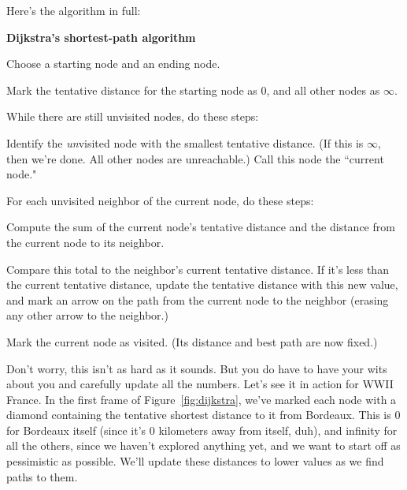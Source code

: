 Here's the algorithm in full:

\vspace{.1in}
\begin{samepage}
\begin{framed}
\textbf{Dijkstra's shortest-path algorithm}
\begin{compactenum}
\item Choose a starting node and an ending node.
\item Mark the tentative distance for the starting node as 0, and all
other nodes as $\infty$.
\item While there are still unvisited nodes, do these steps:
    \begin{compactenum}
    \item \label{choose} Identify the \textit{un}visited node with the smallest tentative
distance. (If this is $\infty$, then we're done. All other nodes are
unreachable.) Call this node the ``current node."
    \item For each unvisited neighbor of the current node, do these steps:
        \begin{compactenum}
        \item Compute the sum of the current node's tentative distance and
the distance from the current node to its neighbor.
        \item Compare this total to the neighbor's current tentative
distance. If it's less than the current tentative distance, update the
tentative distance with this new value, and mark an arrow on the path from
the current node to the neighbor (erasing any other arrow to the neighbor.)
        \item Mark the current node as visited. (Its distance and best path
are now fixed.)
        \end{compactenum}
    \end{compactenum}
\end{compactenum}
\end{framed}
\end{samepage}
\vspace{.2in}

Don't worry, this isn't as hard as it sounds. But you do have to have your
wits about you and carefully update all the numbers. Let's see it in action
for WWII France. In the first frame of Figure~\ref{fig:dijkstra}, we've marked
each node with a diamond containing the tentative shortest distance to it
from Bordeaux. This is 0 for Bordeaux itself (since it's 0 kilometers away
from itself, duh), and infinity for all the others, since we haven't
explored anything yet, and we want to start off as pessimistic as possible.
We'll update these distances to lower values as we find paths to them.

